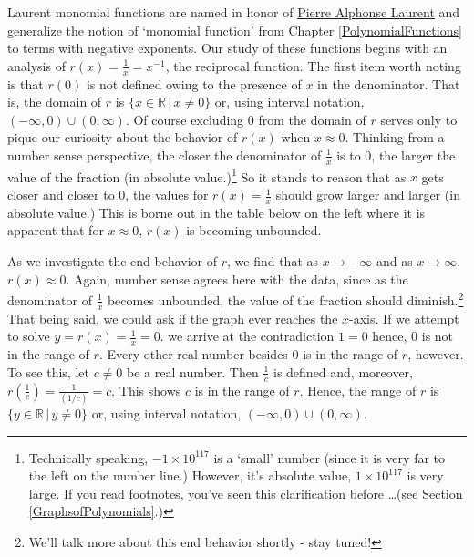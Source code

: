 \documentclass{ximera}
\begin{document}
Laurent monomial functions are named in honor of \href{https://en.wikipedia.org/wiki/Pierre_Alphonse_Laurent}{\underline{Pierre Alphonse Laurent}} and generalize the notion of `monomial function' from Chapter \ref{PolynomialFunctions} to terms with negative exponents. Our study of these functions begins with an analysis of   $r(x) = \frac{1}{x} = x^{-1}$, the reciprocal function. The first item worth  noting is that $r(0)$ is not defined owing to the presence of $x$  in the denominator.  That is, the domain of $r$ is $\{ x \in \mathbb{R} \, | \, x \neq 0\}$ or, using interval notation, $(-\infty, 0) \cup (0, \infty)$.   Of course excluding $0$ from the domain of $r$ serves only to pique our curiosity about the behavior of $r(x)$ when $x \approx 0$.  Thinking from a number sense perspective, the closer the denominator of $\frac{1}{x}$ is to $0$, the larger the value of the  fraction (in absolute value.)\footnote{Technically speaking, $-1 \times 10^{117}$ is a `small' number (since it is very far to the left on the number line.)  However, it's absolute value, $1 \times 10^{117}$ is very large.  If you read footnotes, you've seen this clarification before \ldots (see Section \ref{GraphsofPolynomials}.)}  So it stands to reason that as $x$ gets closer and closer to $0$, the values for $r(x) = \frac{1}{x}$ should grow larger and larger (in absolute value.)  This is borne out in the table below on the left where it is apparent that for $x \approx 0$, $r(x)$ is becoming unbounded.



As we investigate the end behavior of $r$, we find that as $x \rightarrow -\infty$ and as $x \rightarrow \infty$, $r(x) \approx 0$. Again, number sense agrees here with the data, since as the denominator of $\frac{1}{x}$ becomes unbounded, the value of the fraction should diminish.\footnote{We'll talk more about this end behavior shortly - stay tuned!} That being said, we could ask if the graph ever reaches the $x$-axis.  If we attempt to solve $y = r(x) = \frac{1}{x} = 0$. we arrive at the contradiction $1 = 0$ hence, $0$ is not in the range of $r$.  Every other real number besides $0$ is in the range of $r$, however.  To see this, let $c \neq 0$ be a real number.  Then $\frac{1}{c}$ is defined and, moreover, $r \left(\frac{1}{c} \right) = \frac{1}{(1/c)} = c$.  This shows $c$ is in the range of $r$.  Hence, the range of $r$ is $\{ y \in \mathbb{R} \, | \, y \neq 0\}$ or, using interval notation,  $(-\infty, 0) \cup (0, \infty)$.  
\end{document}

